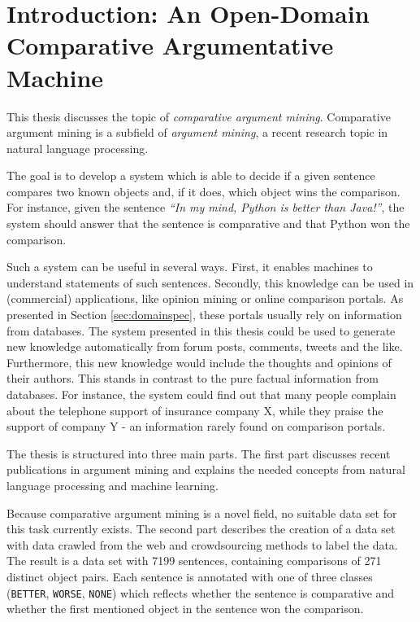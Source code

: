 \chapter{Introduction: An Open-Domain Comparative Argumentative Machine}
This thesis discusses the topic of \emph{comparative argument mining}. Comparative argument mining is a subfield of \emph{argument mining}, a recent research topic in natural language processing.

The goal is to develop a system which is able to decide if a given sentence compares two known objects and, if it does, which object wins the comparison. For instance, given the sentence \emph{\enquote{In my mind, Python is better than Java!}}, the system should answer that the sentence is comparative and that Python won the comparison.

Such a system can be useful in several ways. First, it enables machines to understand statements of such sentences. Secondly, this knowledge can be used in (commercial) applications, like opinion mining or online comparison portals. As presented in Section \ref{sec:domainspec}, these portals usually rely on information from databases. The system presented in this thesis could be used to generate new knowledge automatically from forum posts, comments, tweets and the like. Furthermore, this new knowledge would include the thoughts and opinions of their authors. This stands in contrast to the pure factual information from databases. For instance, the system could find out that many people complain about the telephone support of insurance company X, while they praise the support of company Y - an information rarely found on comparison portals.\newline

The thesis is structured into three main parts. The first part discusses recent publications in argument mining and explains the needed concepts from natural language processing and machine learning.

Because comparative argument mining is a novel field, no suitable data set for this task currently exists. The second part describes the creation of a data set with data crawled from the web and crowdsourcing methods to label the data. The result is a data set with 7199 sentences, containing comparisons of 271 distinct object pairs. Each sentence is annotated with one of three classes (\texttt{BETTER}, \texttt{WORSE}, \texttt{NONE}) which reflects whether the sentence is comparative and whether the first mentioned object in the sentence won the comparison.

